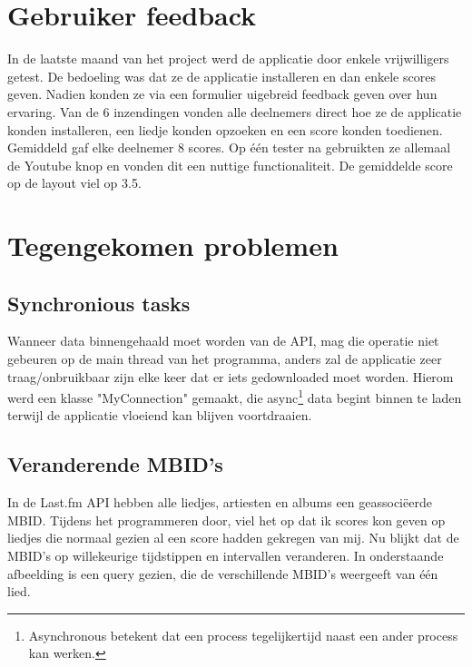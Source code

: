 \documentclass[11pt,a4paper]{article}
\begin{document}
	\newpage
\section{Gebruiker feedback}
\label{sec:feedback}

In de laatste maand van het project werd de applicatie door enkele vrijwilligers getest. De bedoeling was dat ze de applicatie installeren en dan enkele scores geven. Nadien konden ze via een formulier uigebreid feedback geven over hun ervaring. Van de 6 inzendingen vonden alle deelnemers direct hoe ze de applicatie konden installeren, een liedje konden opzoeken en een score konden toedienen. Gemiddeld gaf elke deelnemer 8 scores. Op één tester na gebruikten ze allemaal de Youtube knop en vonden dit een nuttige functionaliteit. De gemiddelde score op de layout viel op 3.5. 

	
\section{Tegengekomen problemen}
\label{sec:Tegengekomen problemen}

	\subsection{Synchronious tasks}
	\label{sec:Synchronious tasks}
	Wanneer data binnengehaald moet worden van de API, mag die operatie niet gebeuren op de main thread van het programma, anders zal de applicatie zeer traag/onbruikbaar zijn elke keer dat er iets gedownloaded moet worden. Hierom werd een klasse "MyConnection" gemaakt, die async\footnote{Asynchronous betekent dat een process tegelijkertijd naast een ander process kan werken.} data begint binnen te laden terwijl de applicatie vloeiend kan blijven voortdraaien.
	

		
	\subsection{Veranderende MBID's}
	\label{sec:veranderendeMBID}
	In de Last.fm API hebben alle liedjes, artiesten en albums een geassociëerde MBID. Tijdens het programmeren door, viel het op dat ik scores kon geven op liedjes die normaal gezien al een score hadden gekregen van mij. Nu blijkt dat de MBID's op willekeurige tijdstippen en intervallen veranderen. In onderstaande afbeelding is een query gezien, die de verschillende MBID's weergeeft van één lied. \\
	
\end{document}
